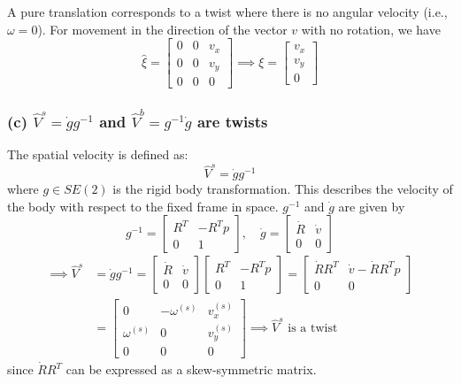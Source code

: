 A pure translation corresponds to a twist where there is no angular velocity (i.e., \( \omega = 0 \)).
For movement in the direction of the vector \( v \) with no rotation, we have
\[
    \hat{\xi} = \begin{bmatrix}
        0 & 0 & v_x \\
        0 & 0 & v_y \\
        0 & 0 & 0
    \end{bmatrix}
    \implies
    \xi = \begin{bmatrix}
        v_x \\
        v_y \\
        0
    \end{bmatrix}
\]

\clearpage
\subsubsection*{(c) \( \hat{V}^{s} = \dot{g} g^{-1} \) and \( \hat{V}^{b} = g^{-1} \dot{g} \) are twists}

The spatial velocity is defined as:
\[
    \hat{V}^{s} = \dot{g} g^{-1}
\]
where \( g \in SE(2) \) is the rigid body transformation.
This describes the velocity of the body with respect to the fixed frame in space.
\( g^{-1} \) and \( \dot g \) are given by
\begin{equation*}
    g^{-1} = \begin{bmatrix}
        R^T & -R^T p \\
        0   & 1
    \end{bmatrix},
    \quad
    \dot{g} = \begin{bmatrix}
        \dot R & \dot v \\
        0      & 0
    \end{bmatrix}
\end{equation*}
\begin{align*}
    \implies
    \hat{V}^{s}
     & =
    \dot{g} g^{-1}
    =
    \begin{bmatrix}
        \dot R & \dot v \\
        0      & 0
    \end{bmatrix}
    \begin{bmatrix}
        R^T & -R^T p \\
        0   & 1
    \end{bmatrix}
    =
    \begin{bmatrix}
        \dot R R^T & \dot v - \dot R R^T p \\
        0          & 0
    \end{bmatrix}
    \\ & =
    \begin{bmatrix}
        0            & -\omega^{(s)} & v_x^{(s)} \\
        \omega^{(s)} & 0             & v_y^{(s)} \\
        0            & 0             & 0
    \end{bmatrix}
    \implies
    \hat{V}^{s} \text{ is a twist}
\end{align*}
since \( \dot R R^T \) can be expressed as a skew-symmetric matrix.

